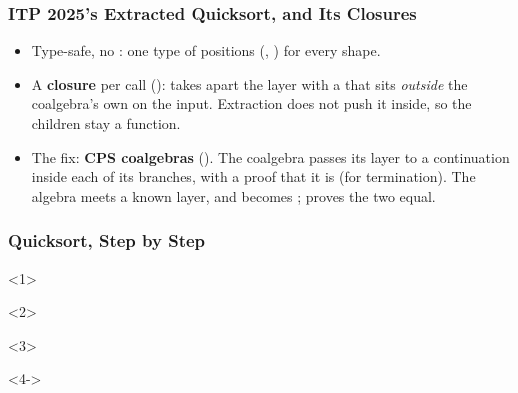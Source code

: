 \begin{frame*}[vertical-alignment = top]
  \frametitle{ITP 2025's Extracted Quicksort, and Its Closures}
  \vspace*{3mm}
  \footnotesize
  \begin{itemize}
    \item Type-safe, no : one type of positions
      (, ) for every shape.
    \item A \textbf{closure} per call ():  takes apart
      the layer  with a  that sits \emph{outside} the
      coalgebra's own  on the input. Extraction does not push
      it inside, so the children stay a function.
    \item The fix: \textbf{CPS coalgebras} (). The coalgebra
      passes its layer to a continuation inside each of its branches, with
      a proof that it is  (for termination). The algebra meets a
      known layer, and  becomes ;  proves the two equal.
  \end{itemize}
\end{frame*}

\begin{frame*}[vertical-alignment = top]
  \frametitle{Quicksort, Step by Step}
  \vspace*{4mm}
  \begin{onlyenv}<1>
  \end{onlyenv}
  \begin{onlyenv}<2>
  \end{onlyenv}
  \begin{onlyenv}<3>
  \end{onlyenv}
  \begin{onlyenv}<4->
  \end{onlyenv}
  \par
\end{frame*}

